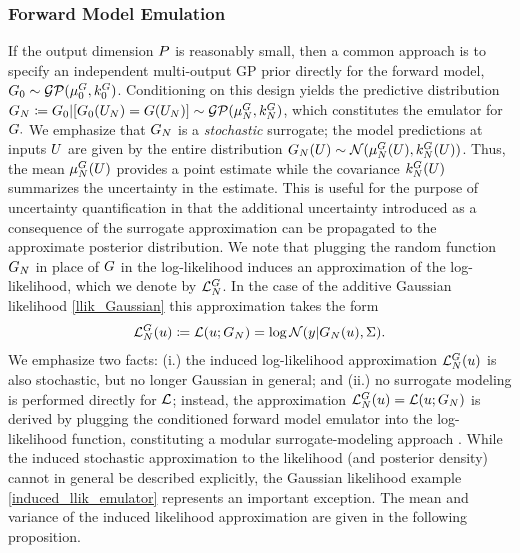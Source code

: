 \documentclass[12pt]{article}
\begin{document}
\subsubsection{Forward Model Emulation}
If the output dimension $\dimObs$ is reasonably small, then a common approach is to specify an independent 
multi-output GP prior directly for the forward model, $\fwdPrior \sim \GP(\emMeanPrior{\fwd}, \emKerPrior{\fwd})$. 
Conditioning on this design yields the predictive distribution 
$\fwdEm[\Ndesign]  \Def \fwdPrior|[\fwdPrior(\designIn) = \fwd(\designIn)] \sim \GP(\emMean[\Ndesign]{\fwd}, \emKer[\Ndesign]{\fwd})$, 
which constitutes the emulator for $\fwd. $
We emphasize that $\fwdEm[\Ndesign]$ is a \textit{stochastic} surrogate; 
the model predictions at inputs $\parMat$ are given by the entire distribution 
$\fwdEm[\Ndesign](\parMat) \sim \Gaussian(\emMean[\Ndesign]{\fwd}(\parMat), \emKer[\Ndesign]{\fwd}(\parMat))$. 
Thus, the mean $\emMean[\Ndesign]{\fwd}(\parMat)$ provides a point estimate while the covariance 
$\emKer[\Ndesign]{\fwd}(\parMat)$ summarizes the uncertainty in the estimate. This is useful for the purpose
of uncertainty quantification in that the additional uncertainty introduced as a consequence of the surrogate 
approximation can be propagated to the approximate posterior distribution. We note that plugging the random 
function $\fwdEm[\Ndesign]$ in place of $\fwd$ in the log-likelihood induces an approximation of the log-likelihood,
which we denote by $\llikEmFwd$. 
In the case of the additive Gaussian likelihood \ref{llik_Gaussian} this approximation takes the form 
\begin{align}
\llikEmFwd(\Par) \Def \llik(\Par; \fwdEm) =  \log\Gaussian(\obs| \fwdEm[\Ndesign](\Par), \likPar). \label{induced_llik_emulator}
\end{align}
We emphasize two facts: (i.) the induced log-likelihood approximation $\llikEmFwd[\Ndesign](\Par)$ is also 
stochastic, but no longer Gaussian in general; and (ii.) no surrogate modeling is performed directly for $\llik$; instead, 
the approximation $\llikEmFwd[\Ndesign](\Par) = \llik(\Par; \fwdEm[\Ndesign])$ is derived by plugging the 
conditioned forward model emulator into the log-likelihood function, 
constituting a modular surrogate-modeling approach \cite{modularization}. While the induced stochastic approximation 
to the likelihood (and posterior density) cannot in general be described explicitly, the Gaussian likelihood 
example \ref{induced_llik_emulator} represents an important exception. The mean and variance of the induced
likelihood approximation are given in the following proposition. 
\end{document}
